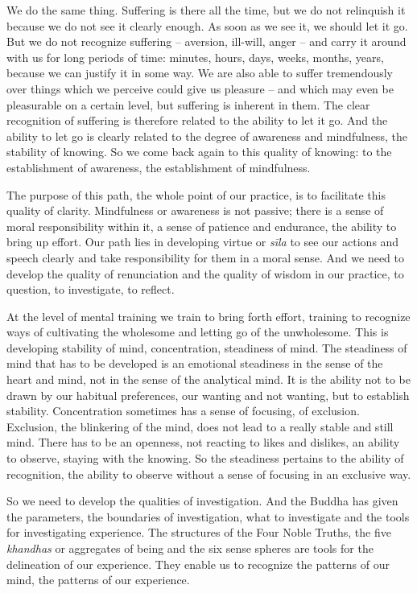 We do the same thing. Suffering is there all the time, but we do not
relinquish it because we do not see it clearly enough. As soon as we see
it, we should let it go. But we do not recognize suffering -- aversion, 
ill-will, anger -- and carry it around with us for long periods of
time: minutes, hours, days, weeks, months, years, because we can justify
it in some way. We are also able to suffer tremendously over things
which we perceive could give us pleasure -- and which may even be
pleasurable on a certain level, but suffering is inherent in them. The
clear recognition of suffering is therefore related to the ability to
let it go. And the ability to let go is clearly related to the degree of
awareness and mindfulness, the stability of knowing. So we come back
again to this quality of knowing: to the establishment of awareness, the
establishment of mindfulness. 

The purpose of this path, the whole point of our practice, is to
facilitate this quality of clarity. Mindfulness or awareness is not
passive; there is a sense of moral responsibility within it, a sense of
patience and endurance, the ability to bring up effort. Our path lies in
developing virtue or \emph{sīla} to see our actions and speech clearly
and take responsibility for them in a moral sense. And we need to
develop the quality of renunciation and the quality of wisdom in our
practice, to question, to investigate, to reflect. 

At the level of mental training we train to bring forth effort, training
to recognize ways of cultivating the wholesome and letting go of the
unwholesome. This is developing stability of mind, concentration, 
steadiness of mind. The steadiness of mind that has to be developed is
an emotional steadiness in the sense of the heart and mind, not in the
sense of the analytical mind. It is the ability not to be drawn by our
habitual preferences, our wanting and not wanting, but to establish
stability. Concentration sometimes has a sense of focusing, of
exclusion. Exclusion, the blinkering of the mind, does not lead to a
really stable and still mind. There has to be an openness, not reacting
to likes and dislikes, an ability to observe, staying with the knowing. 
So the steadiness pertains to the ability of recognition, the ability to
observe without a sense of focusing in an exclusive way. 

So we need to develop the qualities of investigation. And the Buddha has
given the parameters, the boundaries of investigation, what to
investigate and the tools for investigating experience. The structures
of the Four Noble Truths, the five \emph{khandhas} or aggregates of
being and the six sense spheres are tools for the delineation of our
experience. They enable us to recognize the patterns of our mind, the
patterns of our experience. 

